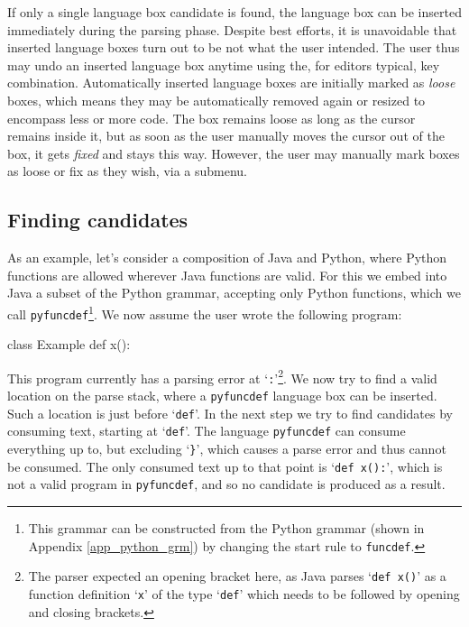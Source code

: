 \documentclass[sigplan,screen]{acmart}\settopmatter{printfolios=true,printccs=false,printacmref=false}
\newcommand{\qtt}[1]{`\texttt{#1}'\xspace}
\begin{document}
If only a single language box candidate is found, the language box can be
inserted immediately during the parsing phase. Despite best efforts, it is
unavoidable that inserted language boxes turn out to be not what the user
intended.  The user thus may undo an inserted language box anytime using the,
for editors typical,  key combination. Automatically inserted
language boxes are initially marked as \emph{loose} boxes, which means they may
be automatically removed again or resized to encompass less or more code. The
box remains loose as long as the cursor remains inside it, but as soon as the
user manually moves the cursor out of the box, it gets \emph{fixed} and stays this
way. However, the user may manually mark boxes as loose or fix as they wish,
via a submenu.

\subsection{Finding candidates}

As an example, let's consider a composition of Java and Python, where Python
functions are allowed wherever Java functions are valid. For this we embed into
Java a subset of the Python grammar, accepting only Python functions, which we
call \texttt{pyfuncdef}\footnote{This grammar can be constructed from the
Python grammar (shown in Appendix \ref{app_python_grm}) by changing the start
rule to \texttt{funcdef}.}. We now assume the user wrote the following program:

\begin{lstdefault}[language=Java]
  class Example {
      def x():
  }
\end{lstdefault}
\vspace{1em}

This program currently has a parsing error at \qtt{:}\footnote{The parser
expected an opening bracket here, as Java parses \qtt{def x()} as a function
definition \qtt{x} of the type \qtt{def} which needs to be followed by opening
and closing brackets.}. We now try to find a valid location on the parse stack,
where a \texttt{pyfuncdef} language box can be inserted. Such a location is just
before \qtt{def}.
In the next step we try to find candidates by consuming text, starting at
\qtt{def}.  The language \texttt{pyfuncdef} can consume everything up to, but
excluding \qtt{\}}, which causes a parse error and thus cannot be consumed. The
only consumed text up to that point is \qtt{def x():}, which is not a valid
program in \texttt{pyfuncdef}, and so no candidate is produced as a result.
\end{document}
